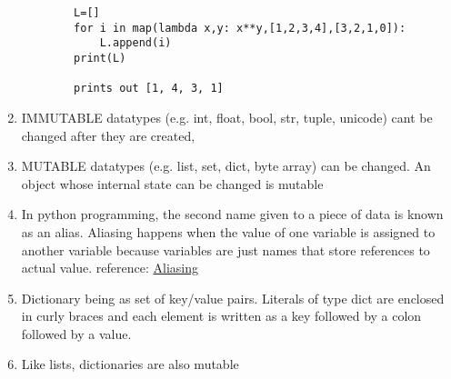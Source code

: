 \documentclass[11pt]{article}
\begin{document}
\begin{enumerate}
\begin{verbatim}
        L=[]
        for i in map(lambda x,y: x**y,[1,2,3,4],[3,2,1,0]):
            L.append(i)
        print(L)

        prints out [1, 4, 3, 1]
        \end{verbatim}
        \item IMMUTABLE datatypes (e.g. int, float, bool, str, tuple, unicode) cant be changed after they are created, 
        \item MUTABLE datatypes (e.g. list, set, dict, byte array) can be changed. An object whose internal state can be changed is mutable
        \item In python programming, the second name given to a piece of data is known as an alias. Aliasing happens when the value of one variable is assigned to another variable because variables are just names that store references to actual value.
        reference: \href{https://www.codesansar.com/python-programming/aliasing.htm#:~:text=In%20python%20programming%2C%20the%20second,store%20references%20to%20actual%20value.&text=So%2C%20both%20variables%20point%20to,same%20string%20object%20'PYTHON'.}{Aliasing}
        \item Dictionary being as set of key/value pairs. Literals of type dict are enclosed in curly braces
        and each element is written as a key followed by a colon followed by a value.
        \item Like lists, dictionaries are also mutable
    \end{enumerate}
\end{document}
